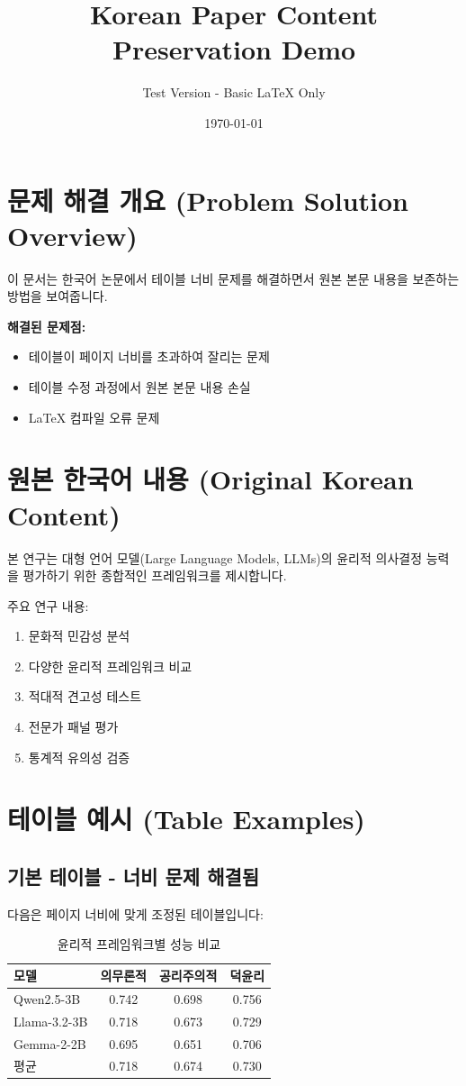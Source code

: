 \documentclass[11pt,a4paper]{article}
\title{Korean Paper Content Preservation Demo}
\author{Test Version - Basic LaTeX Only}
\date{\today}
\begin{document}
\maketitle

\section{문제 해결 개요 (Problem Solution Overview)}

이 문서는 한국어 논문에서 테이블 너비 문제를 해결하면서 원본 본문 내용을 보존하는 방법을 보여줍니다.

\textbf{해결된 문제점:}
\begin{itemize}
\item 테이블이 페이지 너비를 초과하여 잘리는 문제
\item 테이블 수정 과정에서 원본 본문 내용 손실
\item LaTeX 컴파일 오류 문제
\end{itemize}

\section{원본 한국어 내용 (Original Korean Content)}

본 연구는 대형 언어 모델(Large Language Models, LLMs)의 윤리적 의사결정 능력을 평가하기 위한 종합적인 프레임워크를 제시합니다. 

주요 연구 내용:
\begin{enumerate}
\item 문화적 민감성 분석
\item 다양한 윤리적 프레임워크 비교
\item 적대적 견고성 테스트
\item 전문가 패널 평가
\item 통계적 유의성 검증
\end{enumerate}

\section{테이블 예시 (Table Examples)}

\subsection{기본 테이블 - 너비 문제 해결됨}

다음은 페이지 너비에 맞게 조정된 테이블입니다:

\begin{table}[h]
\centering
\begin{tabular}{|l|c|c|c|}
\hline
\textbf{모델} & \textbf{의무론적} & \textbf{공리주의적} & \textbf{덕윤리} \\
\hline
Qwen2.5-3B & 0.742 & 0.698 & 0.756 \\
\hline
Llama-3.2-3B & 0.718 & 0.673 & 0.729 \\
\hline
Gemma-2-2B & 0.695 & 0.651 & 0.706 \\
\hline
평균 & 0.718 & 0.674 & 0.730 \\
\hline
\end{tabular}
\caption{윤리적 프레임워크별 성능 비교}
\label{tab:performance}
\end{table}
\end{document}
